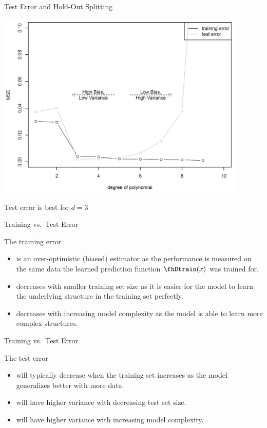 \begin{frame}{Test Error and Hold-Out Splitting}

\scriptsize

\begin{center}
\includegraphics[width=0.9\textwidth]{plots/test_error03.png}
\end{center}

\normalsize  Test error is best for \(d=3\)

\end{frame}

\begin{frame}{Training vs.~Test Error}

The training error

\begin{itemize}
\item
  is an over-optimistic (biased) estimator as the performance is
  measured on the same data the learned prediction function
  \(\fhDtrain(x)\) was trained for.
\item
  decreases with smaller training set size as it is easier for the model
  to learn the underlying structure in the training set perfectly.
\item
  decreases with increasing model complexity as the model is able to
  learn more complex structures.
\end{itemize}

\end{frame}

\begin{frame}{Training vs.~Test Error}

The test error

\begin{itemize}
\item
  will typically decrease when the training set increases as the model
  generalizes better with more data.
\item
  will have higher variance with decreasing test set size.
\item
  will have higher variance with increasing model complexity.
\end{itemize}

\end{frame}

